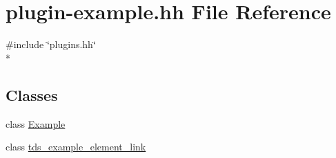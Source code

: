 \hypertarget{plugin-example_8hh}{\section{plugin-\/example.hh File Reference}
\label{plugin-example_8hh}
}
{\ttfamily \#include \char`\"{}plugins.\-hh\char`\"{}}\\*
\subsection*{Classes}
\begin{DoxyCompactItemize}
\item 
class \hyperlink{classExample}{Example}
\item 
class \hyperlink{classtds__example__element__link}{tds\-\_\-example\-\_\-element\-\_\-link}
\end{DoxyCompactItemize}
